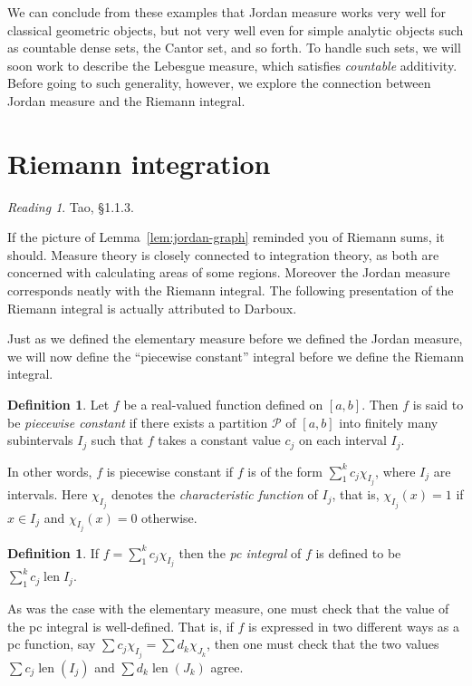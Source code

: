 \documentclass[11pt,oneside]{amsbook}
\DeclareMathOperator{\len}{len}
\theoremstyle{definition}
\theoremstyle{plain}
\theoremstyle{definition}
\newtheorem{defn}[thm]{Definition}
\theoremstyle{remark}
\newtheorem*{reading}{Reading}
\numberwithin{equation}{section}
\numberwithin{figure}{section}
\begin{document}
We can conclude from these examples that Jordan measure works very well for classical geometric objects, but not very well even for simple analytic objects such as countable dense sets, the Cantor set, and so forth. To handle such sets, we will soon work to describe the Lebesgue measure, which  satisfies \emph{countable} additivity. Before going to such generality, however, we explore the connection between Jordan measure and the Riemann integral.

\newpage
\section{Riemann integration}

\begin{reading}
  Tao, \S1.1.3.
\end{reading}

If the picture of Lemma~\ref{lem:jordan-graph} reminded you of Riemann sums, it should. Measure theory is closely connected to integration theory, as both are concerned with calculating areas of some regions. Moreover the Jordan measure corresponds neatly with the Riemann integral. The following presentation of the Riemann integral is actually attributed to Darboux.

Just as we defined the elementary measure before we defined the Jordan measure, we will now define the ``piecewise constant'' integral before we define the Riemann integral.

\begin{defn}
  Let $f$ be a real-valued function defined on $[a,b]$. Then $f$ is said to be \emph{piecewise constant} if there exists a partition $\mathcal P$ of $[a,b]$ into finitely many subintervals $I_j$ such that $f$ takes a constant value $c_j$ on each interval $I_j$.
\end{defn}

In other words, $f$ is piecewise constant if $f$ is of the form $\sum_1^k c_j\chi_{I_j}$, where $I_j$ are intervals. Here $\chi_{I_j}$ denotes the \emph{characteristic function} of $I_j$, that is, $\chi_{I_j}(x)=1$ if $x\in I_j$ and $\chi_{I_j}(x)=0$ otherwise.

\begin{defn}
  If $f=\sum_1^kc_j\chi_{I_j}$ then the \emph{pc integral} of $f$ is defined to be $\sum_1^kc_j\len I_j$.
\end{defn}

As was the case with the elementary measure, one must check that the value of the pc integral is well-defined. That is, if $f$ is expressed in two different ways as a pc function, say $\sum c_j\chi_{I_j}=\sum d_k\chi_{J_k}$, then one must check that the two values $\sum c_j\len(I_j)$ and $\sum d_k\len(J_k)$ agree.
\end{document}
